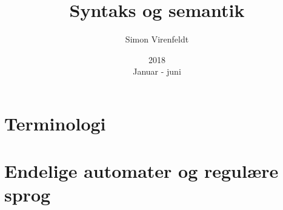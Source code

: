\documentclass[10pt,a4paper,oneside]{article}
\author{Simon Virenfeldt}
\title{Syntaks og semantik}
\date{2018\\Januar - juni}
\begin{document}
    \maketitle
    \section{Terminologi}
    
    \section{Endelige automater og regulære sprog}
    
\end{document}
